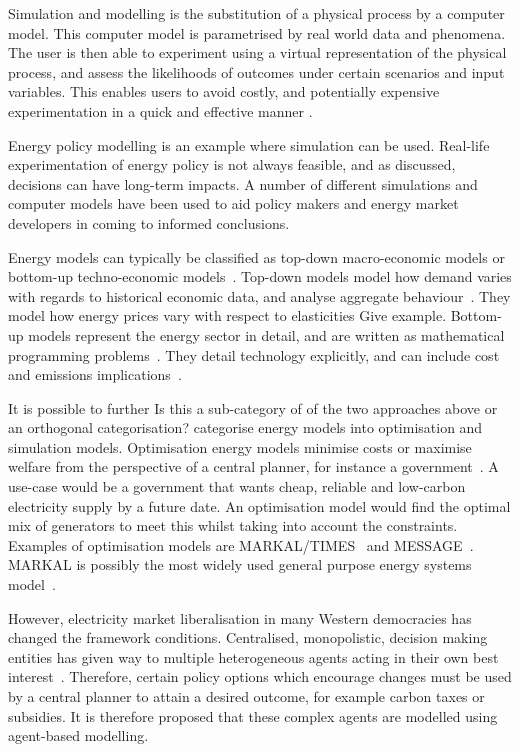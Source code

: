 Simulation and modelling is the substitution of a physical process by a computer model. This computer model is parametrised by real world data and phenomena. The user is then able to experiment using a virtual representation of the physical process, and assess the likelihoods of outcomes under certain scenarios and input variables. This enables users to avoid costly, and potentially expensive experimentation in a quick and effective manner \cite{Law:603360}. 

Energy policy modelling is an example where simulation can be used. Real-life experimentation of energy policy is not always feasible, and as discussed, decisions can have long-term impacts. A number of different simulations and computer models have been used to aid policy makers and energy market developers in coming to informed conclusions.

Energy models can typically be classified as top-down macro-economic models or bottom-up techno-economic models~\cite{Bohringer1998}. Top-down models model how demand varies with regards to historical economic data, and analyse aggregate behaviour~\cite{Hall2016}. They model how energy prices vary with respect to elasticities {\color{red}Give example}. Bottom-up models represent the energy sector in detail, and are written as mathematical programming problems~\cite{Gargiulo2013}. They detail technology explicitly, and can include cost and emissions implications~\cite{Hall2016}.

It is possible to further {\color{red}Is this a sub-category of of the two approaches above or an orthogonal categorisation?} categorise energy models into optimisation and simulation models. Optimisation energy models minimise costs or maximise welfare from the perspective of a central planner, for instance a government~\cite{Keles2017}. A use-case would be a government that wants cheap, reliable and low-carbon electricity supply by a future date. An optimisation model would find the optimal mix of generators to meet this whilst taking into account the constraints. Examples of optimisation models are MARKAL/TIMES~\cite{Fishbone1981} and MESSAGE~\cite{Schrattenholzer1981}. MARKAL is possibly the most widely used general purpose energy systems model~\cite{Pfenninger2014}.

However, electricity market liberalisation in many Western democracies has changed the framework conditions. Centralised, monopolistic, decision making entities has given way to multiple heterogeneous agents acting in their {\color{red}own} best interest~\cite{Most2010}. Therefore, certain policy options which encourage changes must be used by a central planner to attain a desired outcome, for example carbon taxes or subsidies. It is therefore proposed that these complex agents are modelled using agent-based modelling.

